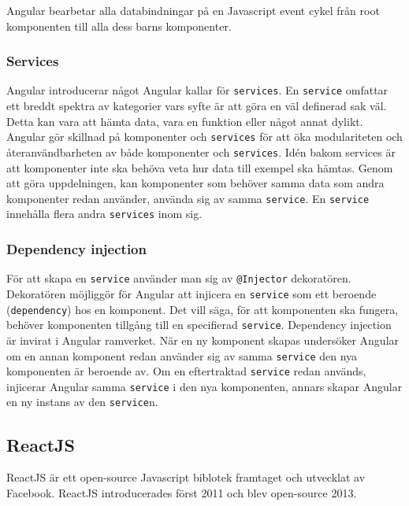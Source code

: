 Angular bearbetar alla databindningar på en Javascript event cykel från root komponenten till alla dess barns komponenter. \cite{angular-components}


\subsubsection{Services}
Angular introducerar något Angular kallar för \texttt{services}. En \texttt{service} omfattar ett breddt spektra av kategorier vars syfte är att göra en väl definerad sak väl. Detta kan vara att hämta data, vara en funktion eller något annat dylikt. Angular gör skillnad på komponenter och \texttt{services} för att öka modulariteten och återanvändbarheten av både komponenter och \texttt{services}. Idén bakom services är att komponenter inte ska behöva veta hur data  till exempel ska hämtas. Genom att göra uppdelningen, kan komponenter som behöver samma data som andra komponenter redan använder, använda sig av samma \texttt{service}. \cite{angular-services} En \texttt{service} innehålla flera andra \texttt{services} inom sig.


\subsubsection{Dependency injection}
För att skapa en \texttt{service} använder man sig av \texttt{@Injector} dekoratören. Dekoratören möjliggör för Angular att injicera en \texttt{service} som ett beroende (\texttt{dependency}) hos en komponent. Det vill säga, för att komponenten ska fungera, behöver komponenten tillgång till en specifierad \texttt{service}. Dependency injection är invirat i Angular ramverket. När en ny komponent skapas undersöker Angular om en annan komponent redan använder sig av samma \texttt{service} den nya komponenten är beroende av. Om en eftertraktad \texttt{service} redan används, injicerar Angular samma \texttt{service} i den nya komponenten, annars skapar Angular en ny instans av den \texttt{service}n. \cite{angular-services}


\subsection{ReactJS}
ReactJS är ett open-source Javascript biblotek framtaget och utvecklat av Facebook. ReactJS introducerades först 2011 och blev open-source 2013. \cite{react-date}

